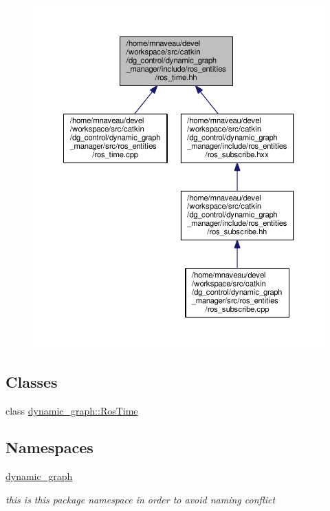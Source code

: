 \begin{figure}[H]
\begin{center}
\leavevmode
\includegraphics[width=350pt]{ros__time_8hh__dep__incl}
\end{center}
\end{figure}
\subsection*{Classes}
\begin{DoxyCompactItemize}
\item 
class \hyperlink{classdynamic__graph_1_1RosTime}{dynamic\+\_\+graph\+::\+Ros\+Time}
\end{DoxyCompactItemize}
\subsection*{Namespaces}
\begin{DoxyCompactItemize}
\item 
 \hyperlink{namespacedynamic__graph}{dynamic\+\_\+graph}
\begin{DoxyCompactList}\small\item\em this is this package namespace in order to avoid naming conflict \end{DoxyCompactList}\end{DoxyCompactItemize}


